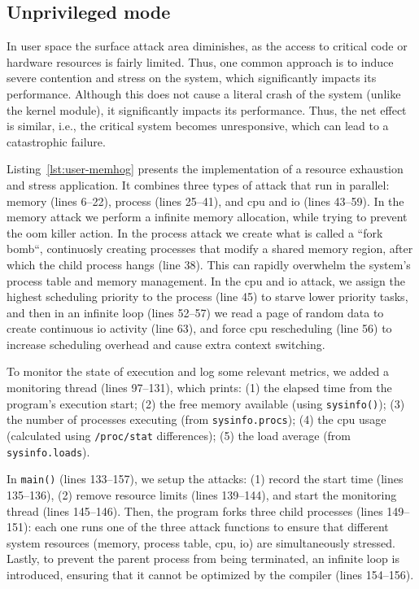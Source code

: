 \subsection{Unprivileged mode}
\label{sec:unprivileged-mode}
In user space the surface attack area diminishes, as the access to critical code
or hardware resources is fairly limited. Thus, one common approach is to induce
severe contention and stress on the system, which significantly impacts its
performance. Although this does not cause a literal crash of the system (unlike
the kernel module), it significantly impacts its performance. Thus, the net
effect is similar, i.e., the critical system becomes unresponsive, which can
lead to a catastrophic failure. 

Listing~\ref{lst:user-memhog} presents the implementation of a resource exhaustion
and stress application. It combines three types of attack that run in parallel: memory (lines
6--22), process (lines 25--41), and \gls{cpu} and \gls{io} (lines 43--59).
In the memory attack we perform a infinite memory allocation, while trying to
prevent the \gls{oom} killer action. In the process attack we create what is
called a ``fork bomb``, continuosly creating processes that modify a shared
memory region, after which the child process hangs (line 38). This can rapidly
overwhelm the system's process table and memory management. In the \gls{cpu} and
\gls{io} attack, we assign the highest scheduling priority to the process (line
45) to starve lower priority tasks, and then in an infinite loop (lines 52--57) we read a
page of random data to create continuous \gls{io} activity (line 63), and force
\gls{cpu} rescheduling (line 56) to increase scheduling overhead and cause extra
context switching.

To monitor the state of execution and log some relevant metrics, we added a
monitoring thread (lines 97--131), which prints: (1) the elapsed time from the
program's execution start; (2) the free
memory available (using \lstinline{sysinfo()}); (3) the number of processes
executing (from \lstinline{sysinfo.procs}); (4) the \gls{cpu} usage (calculated
using \lstinline{/proc/stat} differences); (5)
the load average (from \lstinline{sysinfo.loads}). 

In \lstinline{main()} (lines 133--157), we setup the attacks: (1) record the
start time (lines 135--136), (2) remove resource limits (lines 139--144), and
start the monitoring thread (lines 145--146). Then, the program
forks three child processes (lines 149--151): each one runs one of the three attack functions to
ensure that different system resources (memory, process table, \gls{cpu},
\gls{io}) are simultaneously stressed. Lastly, to prevent the parent process
from being terminated, an infinite loop is introduced, ensuring that it cannot be optimized by the compiler (lines 154--156).

